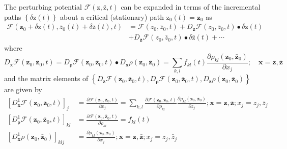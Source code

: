 \documentclass[aps,preprint]{revtex4}%
\begin{document}
The perturbing potential $\mathcal{F}\left(  \mathrm{z,\bar{z}}\mathbf{,}%
t\right)  $ can be expanded in terms of the incremental paths $\left\{
\delta\mathrm{z}\left(  t\right)  \right\}  $ about a critical (stationary)
path $\mathrm{z}_{0}\left(  t\right)  =\mathbf{z}_{0}$ as
\begin{align}
\mathcal{F}\left(  \mathbf{z}_{0}+\delta\mathrm{z}\left(  t\right)  ,\bar
{z}_{0}\left(  t\right)  +\delta\mathrm{\bar{z}}\left(  t\right)
\mathbf{,}t\right)   &  =\mathcal{F}\left(  z_{0},\bar{z}_{0}\mathbf{,}%
t\right)  +D_{\mathbf{z}}\mathcal{F}\left(  z_{0},\bar{z}_{0}\mathbf{,}%
t\right)  \bullet\delta\mathrm{z}\left(  t\right)  \nonumber\\
&  +D_{\mathbf{\bar{z}}}\mathcal{F}\left(  z_{0},\bar{z}_{0}\mathbf{,}%
t\right)  \bullet\delta\mathrm{\bar{z}}\left(  t\right)  +\cdots
\end{align}
where
\begin{equation}
D_{\mathbf{x}}\mathcal{F}\left(  \mathbf{z}_{0},\mathbf{\bar{z}}_{0}%
\mathbf{,}t\right)  =D_{\mathbf{\rho}}\mathcal{F}\left(  \mathbf{z}%
_{0},\mathbf{\bar{z}}_{0}\mathbf{,}t\right)  \bullet D_{\mathbf{x}%
}\mathcal{\rho}\left(  \mathbf{z}_{0},\mathbf{\bar{z}}_{0}\right)  =\sum
_{k,l}f_{kl}\left(  t\right)  \frac{\partial\mathcal{\rho}_{kl}\left(
\mathbf{z}_{0},\mathbf{\bar{z}}_{0}\right)  }{\partial x_{j}};\quad
\mathbf{x=z,\bar{z}}%
\end{equation}
and the matrix elements of $\left\{  D_{\mathbf{z}}\mathcal{F}\left(
\mathbf{z}_{0},\mathbf{\bar{z}}_{0}\mathbf{,}t\right)  ,D_{\mathbf{\rho}%
}\mathcal{F}\left(  \mathbf{z}_{0},\mathbf{\bar{z}}_{0}\mathbf{,}t\right)
,D_{\mathbf{z}}\mathcal{\rho}\left(  \mathbf{z}_{0},\mathbf{\bar{z}}%
_{0}\right)  \right\}  $ are given by
\begin{align}
\left[  D_{\mathbf{x}}^{1}\mathcal{F}\left(  \mathbf{z}_{0},\mathbf{\bar{z}%
}_{0}\mathbf{,}t\right)  \right]  _{j} &  =\frac{\partial\mathcal{F}\left(
\mathbf{z}_{0},\mathbf{\bar{z}}_{0}\mathbf{,}t\right)  }{\partial x_{j}}%
=\sum_{k,l}\frac{\partial\mathcal{F}\left(  \mathbf{z}_{0},\mathbf{\bar{z}%
}_{0}\mathbf{,}t\right)  }{\partial\rho_{kl}}\frac{\partial\mathcal{\rho}%
_{kl}\left(  \mathbf{z}_{0},\mathbf{\bar{z}}_{0}\right)  }{\partial z_{j}%
};\mathbf{x=z,\bar{z};}x_{j}=z_{j},\bar{z}_{j}\nonumber\\
\left[  D_{\mathbf{\rho}}^{1}\mathcal{F}\left(  \mathbf{z}_{0},\mathbf{\bar
{z}}_{0}\mathbf{,}t\right)  \right]  _{kl} &  =\frac{\partial\mathcal{F}%
\left(  \mathbf{z}_{0},\mathbf{\bar{z}}_{0}\mathbf{,}t\right)  }{\partial
\rho_{kl}}=f_{kl}\left(  t\right)  \nonumber\\
\left[  D_{\mathbf{x}}^{1}\mathcal{\rho}\left(  \mathbf{z}_{0},\mathbf{\bar
{z}}_{0}\right)  \right]  _{klj} &  =\frac{\partial\mathcal{\rho}_{kl}\left(
\mathbf{z}_{0},\mathbf{\bar{z}}_{0}\right)  }{\partial x_{j}};\mathbf{x=z,\bar
{z};}x_{j}=z_{j},\bar{z}_{j}%
\end{align}
\end{document}
